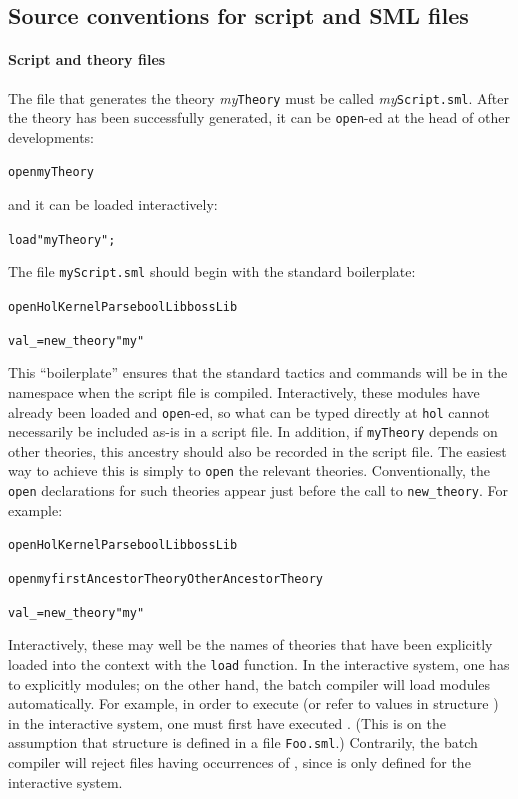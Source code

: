 \subsection{Source conventions for script and SML files}

\paragraph{Script and theory files}
The file that generates the \HOL{} theory \textit{my}\texttt{Theory} must be called \textit{my}\texttt{Script.sml}.
After the theory has been successfully generated, it can be \texttt{open}-ed at the head of other developments:
\begin{alltt}
    open myTheory
\end{alltt}
and it can be loaded interactively:
\begin{alltt}
    load "myTheory";
\end{alltt}
The file \texttt{myScript.sml} should begin with the standard boilerplate:
\begin{alltt}
    open HolKernel Parse boolLib bossLib

    val _ = new_theory "my"
\end{alltt}
This ``boilerplate'' ensures that the standard tactics and \ML{} commands will be in the namespace when the script file is compiled.
Interactively, these modules have already been loaded and \texttt{open}-ed, so what can be typed directly at \texttt{hol} cannot necessarily be included as-is in a script file.
In addition, if \texttt{myTheory} depends on other \HOL{} theories, this ancestry should also be recorded in the script file.
The easiest way to achieve this is simply to \texttt{open} the relevant theories.
Conventionally, the \texttt{open} declarations for such theories appear just before the call to \texttt{new_theory}.
For example:
\begin{alltt}
    open HolKernel Parse boolLib bossLib

    open myfirstAncestorTheory OtherAncestorTheory

    val _ = new_theory "my"
\end{alltt}
Interactively, these may well be the names of theories that have been explicitly loaded into the context with the \texttt{load} function.
In the interactive system, one has to explicitly  modules; on the other hand, the batch compiler will load modules automatically.
For example, in order to execute  (or refer to values in structure ) in the interactive system, one must first have executed .
(This is on the assumption that structure  is defined in a file \texttt{Foo.sml}.)
Contrarily, the batch compiler will reject files having occurrences of , since  is only defined for the interactive system.


